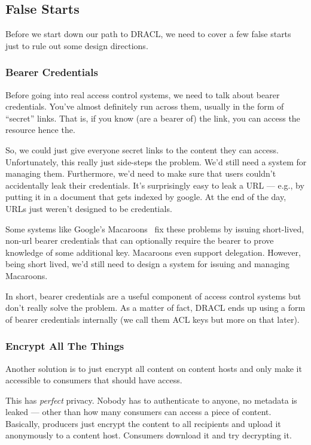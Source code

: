 \documentclass[pdftex,12pt,a4papaer,twoside,notitlepage]{report}
\begin{document}
\subsection{False Starts}

Before we start down our path to DRACL, we need to cover a few false starts just
to rule out some design directions.

\subsubsection{Bearer Credentials}

Before going into real access control systems, we need to talk about bearer
credentials. You've almost definitely run across them, usually in the form of
``secret'' links. That is, if you know (are a bearer of) the link, you can
access the resource hence the.

So, we could just give everyone secret links to the content they can access.
Unfortunately, this really just side-steps the problem. We'd still need a system
for managing them. Furthermore, we'd need to make sure that users couldn't
accidentally leak their credentials. It's surprisingly easy to leak a URL ---
e.g., by putting it in a document that gets indexed by google. At the end of the
day, URLs just weren't designed to be credentials.

Some systems like Google's Macaroons~\cite{macaroon} fix these problems by
issuing short-lived, non-url bearer credentials that can optionally require the
bearer to prove knowledge of some additional key. Macaroons even support
delegation. However, being short lived, we'd still need to design a system for
issuing and managing Macaroons.

In short, bearer credentials are a useful component of access control systems
but don't really solve the problem. As a matter of fact, DRACL ends up using a
form of bearer credentials internally (we call them ACL keys but more on that
later).

\subsubsection{Encrypt All The Things}

Another solution is to just encrypt all content on content hosts and only make
it accessible to consumers that should have access.

This has \emph{perfect} privacy. Nobody has to authenticate to anyone, no
metadata is leaked --- other than how many consumers can access a piece of
content. Basically, producers just encrypt the content to all recipients and
upload it anonymously to a content host. Consumers download it and try
decrypting it.
\end{document}
